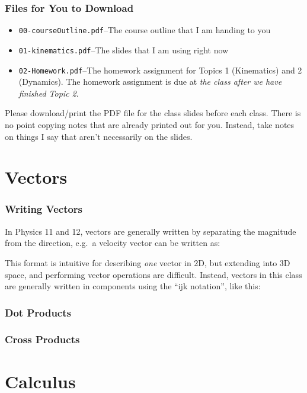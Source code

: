 \documentclass[12pt,compress,aspectratio=169]{beamer}
\newcommand{\mb}[1]{\ensuremath\mathbf{#1}}
\newcommand{\eq}[2]{\vspace{#1}{\Large\begin{displaymath}#2\end{displaymath}}}
\begin{document}
\begin{frame}
  \frametitle{Files for You to Download}
  \begin{itemize}
  \item\texttt{00-courseOutline.pdf}--The course outline that I am handing to
    you
  \item\texttt{01-kinematics.pdf}--The slides that I am using right now
  \item\texttt{02-Homework.pdf}--The homework assignment for Topics 1
    (Kinematics) and 2 (Dynamics). The homework assignment is due at
    \emph{the class after we have finished Topic 2}.
  \end{itemize}
  Please download/print the PDF file for the class slides before each class.
  There is no point copying notes that are already printed out for you.
  Instead, take notes on things I say that aren't necessarily on the slides.
\end{frame}




\section{Vectors}

\begin{frame}
  \frametitle{Writing Vectors}
  In Physics 11 and 12, vectors are generally written by separating the
  magnitude from the direction, e.g.\ a velocity vector can be written as:
  
  \eq{-.1in}{
    \mb{v}=\SI{4.5}{m/s}\text{ [N \ang{55} E]}
  }

  \vspace{-.1in}This format is intuitive for describing \emph{one} vector in
  2D, but extending into 3D space, and performing vector operations are
  difficult. Instead, vectors in this class are generally written in components
  using the ``ijk notation'', like this:

\end{frame}


\begin{frame}
  \frametitle{Dot Products}
  
\end{frame}



\begin{frame}
  \frametitle{Cross Products}
  
\end{frame}

\section{Calculus}
\end{document}
